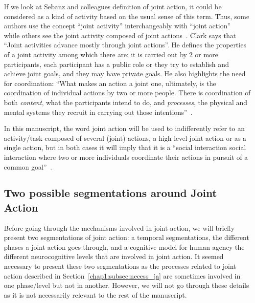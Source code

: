\documentclass[a4paper,11pt,twoside]{StyleThese}
\begin{document}
If we look at Sebanz and colleagues definition of joint action, it could be considered as a kind of activity based on the usual sense of this term. Thus, some authors use the concept ``joint activity'' interchangeably with ``joint action''~\cite{tollefsen_2005_let,grafenhain_2013_three} while others see the joint activity composed of joint actions~\cite{clark_1996_using, feltovitch_2005_common}. Clark says that ``Joint activities advance mostly through joint actions''. He defines the properties of a joint activity among which there are: it is carried out by 2 or more participants, each participant has a public role or they try to establish and achieve joint goals, and they may have private goals. He also highlights the need for coordination: ``What makes an action a joint one, ultimately, is the coordination of individual actions by two or more people. There is coordination of both \emph{content}, what the participants intend to do, and \emph{processes}, the physical and mental systems they recruit in carrying out those intentions''~\cite[p~.59]{clark_1996_using}. 

In this manuscript, the word joint action will be used to indifferently refer to an activity/task composed of several (joint) actions, \ie a high level joint action or as a single action, but in both cases it will imply that it is a ``social interaction social interaction where two or more individuals coordinate their actions in pursuit of a common goal''~\cite{castro_2020_joint}.

\subsection{Two possible segmentations around Joint Action}

Before going through the mechanisms involved in joint action, we will briefly present two segmentations of joint action: a temporal segmentations, \ie the different phases a joint action goes through, and a cognitive model for human agency \ie the different neurocognitive levels that are involved in joint action. It seemed necessary to present these two segmentations as the processes related to joint action described in Section~\ref{chap1:subsec:necess_ja} are sometimes involved in one phase/level but not in another. However, we will not go through these details as it is not necessarily relevant to the rest of the manuscript.
\end{document}
